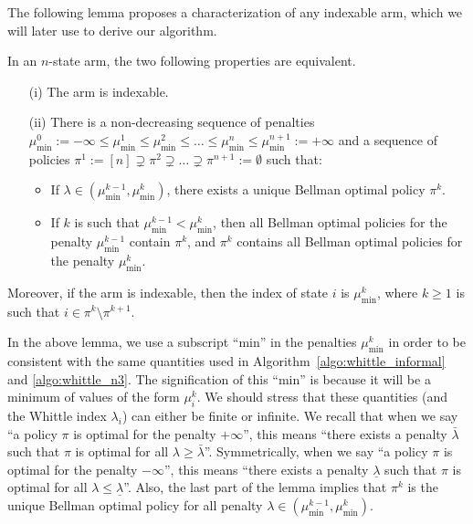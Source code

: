 The following lemma proposes a characterization of any indexable arm, which we will later use to derive our algorithm.
\begin{lem}
    \label{ch:cpt:lem:idx}
    In an $n$-state arm, the two following properties are equivalent.
    \begin{enumerate}
        \item[(i)] The arm is indexable.
        \item[(ii)] There is a non-decreasing sequence of penalties $\mu_{\min}^0:=-\infty\le\mu^1_{\min}\le\mu^2_{\min}\le\dots\le\mu^n_{\min}\le\mu^{n+1}_{\min}:=+\infty$ and a sequence of policies $\pi^1:=[n]\supsetneq\pi^2\supsetneq\dots\supsetneq\pi^{n+1}:=\emptyset$ such that:
        \begin{itemize}
            \item If $\lambda\in(\mu^{k-1}_{\min},\mu^{k}_{\min})$, there exists a unique Bellman optimal policy $\pi^{k}$.
            \item If $k$ is such that $\mu^{k-1}_{\min}<\mu^{k}_{\min}$, then all Bellman optimal policies for the penalty $\mu^{k-1}_{\min}$ contain $\pi^{k}$, and $\pi^k$ contains all Bellman optimal policies for the penalty $\mu^k_{\min}$.
        \end{itemize}
    \end{enumerate}
    Moreover, if the arm is indexable, then the index of state $i$ is $\mu^k_{\min}$, where $k\ge1$ is such that $i\in\pi^k\setminus\pi^{k+1}$.
\end{lem}

In the above lemma, we use a subscript ``min'' in the penalties $\mu^{k}_{\min}$ in order to be consistent with the same quantities used in Algorithm~\ref{algo:whittle_informal} and \ref{algo:whittle_n3}.  The signification of this ``min'' is because it will be a minimum of values of the form $\mu^k_i$.
We should stress that these quantities (and the Whittle index $\lambda_i$) can either be finite or infinite.
We recall that when we say ``a policy $\pi$ is optimal for the penalty $+\infty$'', this means ``there exists a penalty $\bar{\lambda}$ such that $\pi$ is optimal for all $\lambda\ge\bar{\lambda}$''. 
Symmetrically, when we say ``a policy $\pi$ is optimal for the penalty $-\infty$'', this means ``there exists a penalty $\underline{\lambda}$ such that $\pi$ is optimal for all $\lambda\le\underline{\lambda}$''.
Also, the last part of the lemma implies that $\pi^k$ is the unique Bellman optimal policy for all penalty $\lambda\in(\mu^{k-1}_{\min}, \mu^{k}_{\min})$.


